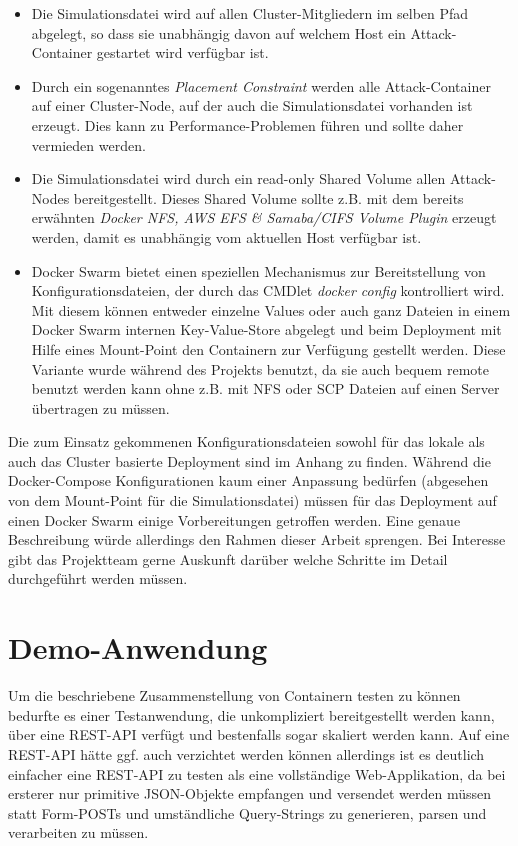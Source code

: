\begin{itemize}
	\item Die Simulationsdatei wird auf allen Cluster-Mitgliedern im selben Pfad abgelegt, so dass sie unabh\"angig davon auf welchem Host ein Attack-Container gestartet wird verf\"ugbar ist.
	\item Durch ein sogenanntes \textit{Placement Constraint} werden alle Attack-Container auf einer Cluster-Node, auf der auch die Simulationsdatei vorhanden ist erzeugt. Dies kann zu Performance-Problemen f\"uhren und sollte daher vermieden werden.
	\item Die Simulationsdatei wird durch ein read-only Shared Volume allen Attack-Nodes bereitgestellt. Dieses Shared Volume sollte z.B. mit dem bereits erw\"ahnten \textit{Docker NFS, AWS EFS \& Samaba/CIFS Volume Plugin} erzeugt werden, damit es unabh\"angig vom aktuellen Host verf\"ugbar ist.
	\item Docker Swarm bietet einen speziellen Mechanismus zur Bereitstellung von Konfigurationsdateien, der durch das CMDlet \textit{docker config} kontrolliert wird. Mit diesem k\"onnen entweder einzelne Values oder auch ganz Dateien in einem Docker Swarm internen Key-Value-Store abgelegt und beim Deployment mit Hilfe eines Mount-Point den Containern zur Verf\"ugung gestellt werden. Diese Variante wurde w\"ahrend des Projekts benutzt, da sie auch bequem remote benutzt werden kann ohne z.B. mit NFS oder SCP Dateien auf einen Server \"ubertragen zu m\"ussen.
\end{itemize}

Die zum Einsatz gekommenen Konfigurationsdateien sowohl f\"ur das lokale als auch das Cluster basierte Deployment sind im Anhang zu finden.
W\"ahrend die Docker-Compose Konfigurationen kaum einer Anpassung bed\"urfen (abgesehen von dem Mount-Point f\"ur die Simulationsdatei) m\"ussen f\"ur das Deployment auf einen Docker Swarm einige Vorbereitungen getroffen werden.
Eine genaue Beschreibung w\"urde allerdings den Rahmen dieser Arbeit sprengen.
Bei Interesse gibt das Projektteam gerne Auskunft dar\"uber welche Schritte im Detail durchgef\"uhrt werden m\"ussen.

\section{Demo-Anwendung}

Um die beschriebene Zusammenstellung von Containern testen zu k\"onnen bedurfte es einer Testanwendung, die unkompliziert bereitgestellt werden kann, \"uber eine REST-API verf\"ugt und bestenfalls sogar skaliert werden kann.
Auf eine REST-API h\"atte ggf. auch verzichtet werden k\"onnen allerdings ist es deutlich einfacher eine REST-API zu testen als eine vollst\"andige Web-Applikation, da bei ersterer nur primitive JSON-Objekte empfangen und versendet werden m\"ussen statt Form-POSTs und umst\"andliche Query-Strings zu generieren, parsen und verarbeiten zu m\"ussen.


